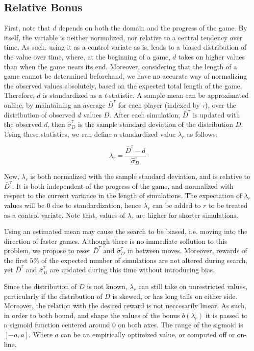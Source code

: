 \documentclass{ecai2014}
\begin{document}
\subsection{Relative Bonus}
\label{subsec:rb}
First, note that $d$ depends on both the domain and the progress of the game. By itself, the variable is neither normalized, nor relative to a central tendency over time. As such, using it as a control variate as is, leads to a biased distribution of the value over time, where, at the beginning of a game, $d$ takes on higher values than when the game nears its end. Moreover, considering that the length of a game cannot be determined beforehand, we have no accurate way of normalizing the observed values absolutely, based on the expected total length of the game. Therefore, $d$ is standardized as a \emph{t}-statistic. A sample mean can be approximated online, by maintaining an average $\bar{D}^\tau$ for each player (indexed by $\tau$), over the distribution of observed $d$ values $D$. After each simulation, $\bar{D}^\tau$ is updated with the observed $d$, then $\hat{\sigma}^\tau_D$ is the sample standard deviation of the distribution $D$. Using these statistics, we can define a standardized value $\lambda_r$ as follows:

\begin{equation}
\lambda_r = \frac{\bar{D}^\tau - d}{\hat{\sigma}^\tau_D}
\end{equation}

Now, $\lambda_r$ is both normalized with the sample standard deviation, and is relative to $\bar{D}^\tau$. It is both independent of the progress of the game, and normalized with respect to the current variance in the length of simulations. The expectation of $\lambda_r$ values will be 0 due to standardization, hence $\lambda_r$ can be added to $r$ to be treated as a control variate. Note that, values of $\lambda_r$ are higher for shorter simulations.

Using an estimated mean may cause the search to be biased, i.e. moving into the direction of faster games. Although there is no immediate sollution to this problem, we propose to reset $\bar{D}^\tau$ and $\hat{\sigma}^\tau_D$ in between moves. Moreover, rewards of the first $5\%$ of the expected number of simulations are not altered during search, yet $\bar{D}^\tau$ and $\hat{\sigma}^\tau_D$ are updated during this time without introducing bias.

Since the distribution of $D$ is not known, $\lambda_r$ can still take on unrestricted values, particularly if the distribution of $D$ is skewed, or has long tails on either side. Moreover, the relation with the desired reward is not neccesarily linear. As such, in order to both bound, and shape the values of the bonus $b(\lambda_r)$ it is passed to a sigmoid function centered around $0$ on both axes. The range of the sigmoid is $[-a, a]$. Where $a$ can be an empirically optimized value, or computed off or on-line.
\end{document}
